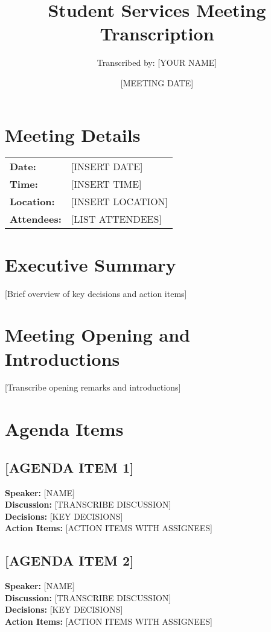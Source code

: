 \documentclass[12pt,a4paper]{article}
\title{Student Services Meeting Transcription}
\author{Transcribed by: [YOUR NAME]}
\date{[MEETING DATE]}
\begin{document}
\maketitle

\section*{Meeting Details}
\begin{tabular}{ll}
\textbf{Date:} & [INSERT DATE] \\
\textbf{Time:} & [INSERT TIME] \\
\textbf{Location:} & [INSERT LOCATION] \\
\textbf{Attendees:} & [LIST ATTENDEES] \\
\end{tabular}

\section*{Executive Summary}
[Brief overview of key decisions and action items]

\section{Meeting Opening and Introductions}
[Transcribe opening remarks and introductions]

\section{Agenda Items}

\subsection{[AGENDA ITEM 1]}
\textbf{Speaker:} [NAME] \\
\textbf{Discussion:} [TRANSCRIBE DISCUSSION] \\
\textbf{Decisions:} [KEY DECISIONS] \\
\textbf{Action Items:} [ACTION ITEMS WITH ASSIGNEES]

\subsection{[AGENDA ITEM 2]}
\textbf{Speaker:} [NAME] \\
\textbf{Discussion:} [TRANSCRIBE DISCUSSION] \\
\textbf{Decisions:} [KEY DECISIONS] \\
\textbf{Action Items:} [ACTION ITEMS WITH ASSIGNEES]
\end{document}
